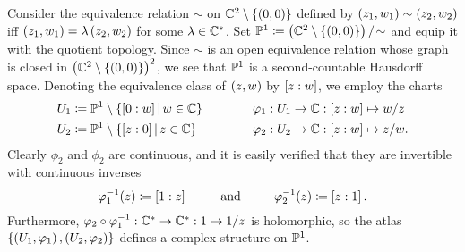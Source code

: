 \documentclass[../Moduli_Spaces_of_Riemann_Surfaces.tex]{subfiles}
\begin{document}
    \begin{example}\label{1.1:exa:complex_projective_line}
        Consider the equivalence relation $\sim$ on $\C^2\comp\l\{\tpl{0,0}\r\}$ defined by $\tpl{z_1,w_1}\sim\tpl{z_2,w_2}$ iff $\tpl{z_1,w_1}=\lambda\tpl{z_2,w_2}$ for some $\lambda\in\C^\ast$. Set $\P^1\coloneqq\l(\C^2\comp\l\{\tpl{0,0}\r\}\r)/\!\sim$ and equip it with the quotient topology. Since $\sim$ is an open equivalence relation whose graph is closed in $\l(\C^2\comp\l\{\tpl{0,0}\r\}\r)^2$, we see that $\P^1$ is a second-countable Hausdorff space. Denoting the equivalence class of $\tpl{z,w}$ by $\proje{z:w}$, we employ the charts
        \begin{equation*}
            \begin{alignedat}{2}
                U_1&\coloneqq\P^1\comp\l\{\proje{0:w}\mid w\in\C\r\}\ \ \ \ \ \ \ \ \ \ \ \ &&\phi_1:U_1\to\C:\proje{z:w}\mapsto w/z \\
                U_2&\coloneqq\P^1\comp\l\{\proje{z:0}\mid z\in\C\r\}&&\phi_2:U_2\to\C:\proje{z:w}\mapsto z/w.
            \end{alignedat}
        \end{equation*}
        Clearly $\phi_2$ and $\phi_2$ are continuous, and it is easily verified that they are invertible with continuous inverses
        \begin{equation*}
            \phi_1^{-1}\!\l(z\r)\coloneqq\proje{1:z}\ \ \ \ \ \ \ \ \textrm{and}\ \ \ \ \ \ \ \ \phi_2^{-1}\!\l(z\r)\coloneqq\proje{z:1}.
        \end{equation*}
        Furthermore, $\phi_2\circ\phi_1^{-1}:\C^\ast\to\C^\ast:1\mapsto1/z$ is holomorphic, so the atlas $\l\{\tpl{U_1,\phi_1},\tpl{U_2,\phi_2}\r\}$ defines a complex structure on $\P^1$.\exqed
    \end{example}
\end{document}
